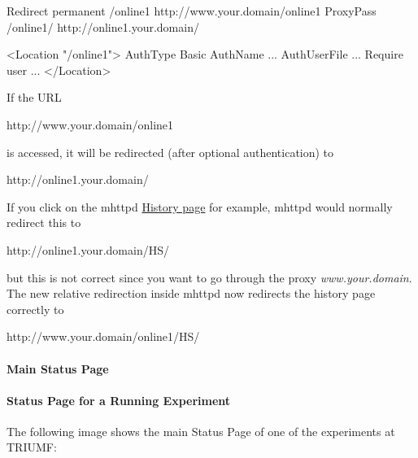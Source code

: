 \begin{DoxyCode}
Redirect permanent /online1 http://www.your.domain/online1
ProxyPass /online1/  http://online1.your.domain/

<Location "/online1">
  AuthType Basic
  AuthName ...
  AuthUserFile ...
  Require user ...
</Location>
\end{DoxyCode}


If the URL 
\begin{DoxyCode}
http://www.your.domain/online1
\end{DoxyCode}
 is accessed, it will be redirected (after optional authentication) to 
\begin{DoxyCode}
http://online1.your.domain/
\end{DoxyCode}
 \par
 If you click on the mhttpd \hyperlink{RC_mhttpd_History_page}{History page} for example, mhttpd would normally redirect this to 
\begin{DoxyCode}
http://online1.your.domain/HS/
\end{DoxyCode}
 but this is not correct since you want to go through the proxy {\itshape www.your.domain\/}. The new relative redirection inside mhttpd now redirects the history page correctly to 
\begin{DoxyCode}
http://www.your.domain/online1/HS/
\end{DoxyCode}


\label{index_end}
\hypertarget{index_end}{}
 \par
  \paragraph{Main Status Page}\label{RC_mhttpd_Main_Status_page}
\label{RC_mhttpd_status_page_redesign_idx_mhttpd_page_status}
\hypertarget{RC_mhttpd_status_page_redesign_idx_mhttpd_page_status}{}


\par


 \par


\label{RC_mhttpd_Main_Status_page_RC_mhttpd_main_status}
\hypertarget{RC_mhttpd_Main_Status_page_RC_mhttpd_main_status}{}
 \hypertarget{RC_mhttpd_Main_Status_page_RC_mhttpd_msp_customized}{}\paragraph{Status Page for a Running Experiment}\label{RC_mhttpd_Main_Status_page_RC_mhttpd_msp_customized}
The following image shows the main Status Page of one of the experiments at TRIUMF:

